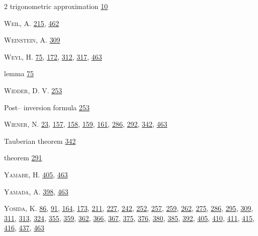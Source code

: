 \begin{multicols}{2}
\hspace*{2.2em}trigonometric approximation \hyperlink{page.10}{10}\par
\noindent \textsc{Weil}, A. \hyperlink{page.215}{215}, \hyperlink{page.462}{462}\par
\noindent \textsc{Weinstein}, A. \hyperlink{page.309}{309}\par
\noindent \textsc{Weyl}, H. \hyperlink{page.75}{75}, \hyperlink{page.172}{172}, \hyperlink{page.312}{312}, \hyperlink{page.317}{317}, \hyperlink{page.463}{463}\par
\hspace*{1.1em}lemma \hyperlink{page.75}{75}\par
\noindent \textsc{Widder}, D. V. \hyperlink{page.253}{253}\par
\hspace*{1.1em}Post-- inversion formula \hyperlink{page.253}{253}\par
\noindent \textsc{Wiener}, N. \hyperlink{page.23}{23}, \hyperlink{page.157}{157}, \hyperlink{page.158}{158}, \hyperlink{page.159}{159}, \hyperlink{page.161}{161}, \hyperlink{page.286}{286}, \hyperlink{page.292}{292}, \hyperlink{page.342}{342}, \hyperlink{page.463}{463}\par
\hspace*{1.1em}Tauberian theorem \hyperlink{page.342}{342}\par
\hspace*{1.1em}theorem \hyperlink{page.291}{291}\par
\noindent \textsc{Yamabe}, H. \hyperlink{page.405}{405}, \hyperlink{page.463}{463}\par
\noindent \textsc{Yamada}, A. \hyperlink{page.398}{398}, \hyperlink{page.463}{463}\par
\noindent \textsc{Yosida}, K. \hyperlink{page.86}{86}, \hyperlink{page.91}{91}, \hyperlink{page.164}{164}, \hyperlink{page.173}{173}, \hyperlink{page.211}{211}, \hyperlink{page.227}{227}, \hyperlink{page.242}{242}, \hyperlink{page.252}{252}, \hyperlink{page.257}{257}, \hyperlink{page.259}{259}, \hyperlink{page.262}{262}, \hyperlink{page.275}{275}, \hyperlink{page.286}{286}, \hyperlink{page.295}{295}, \hyperlink{page.309}{309}, \hyperlink{page.311}{311}, \hyperlink{page.313}{313}, \hyperlink{page.324}{324}, \hyperlink{page.355}{355}, \hyperlink{page.359}{359}, \hyperlink{page.362}{362}, \hyperlink{page.366}{366}, \hyperlink{page.367}{367}, \hyperlink{page.375}{375}, \hyperlink{page.376}{376}, \hyperlink{page.380}{380}, \hyperlink{page.385}{385}, \hyperlink{page.392}{392}, \hyperlink{page.405}{405}, \hyperlink{page.410}{410}, \hyperlink{page.411}{411}, \hyperlink{page.415}{415}, \hyperlink{page.416}{416}, \hyperlink{page.437}{437}, \hyperlink{page.463}{463}\par

\end{multicols}
